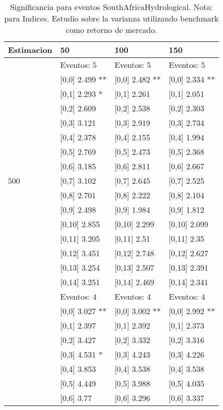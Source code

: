 \begin{table}

\caption{Significancia para eventos SouthAfricaHydrological. Nota: para Indices. Estudio sobre la varianza utilizando benchmark como retorno de mercado.}
\centering
\begin{tabular}[t]{llll}
\toprule
Estimacion & 50 & 100 & 150\\
\midrule
 & Eventos:  5 & Eventos:  5 & Eventos:  5\\
 & {}[0,0] 2.499 ** & {}[0,0] 2.482 ** & {}[0,0] 2.334 **\\
 & {}[0,1] 2.293 * & {}[0,1] 2.261 & {}[0,1] 2.051\\
 & {}[0,2] 2.609 & {}[0,2] 2.538 & {}[0,2] 2.303\\
 & {}[0,3] 3.121 & {}[0,3] 2.919 & {}[0,3] 2.734\\
\addlinespace
 & {}[0,4] 2.378 & {}[0,4] 2.155 & {}[0,4] 1.994\\
 & {}[0,5] 2.769 & {}[0,5] 2.473 & {}[0,5] 2.368\\
 & {}[0,6] 3.185 & {}[0,6] 2.811 & {}[0,6] 2.667\\
500 & {}[0,7] 3.102 & {}[0,7] 2.645 & {}[0,7] 2.525\\
 & {}[0,8] 2.701 & {}[0,8] 2.222 & {}[0,8] 2.104\\
\addlinespace
 & {}[0,9] 2.498 & {}[0,9] 1.984 & {}[0,9] 1.812\\
 & {}[0,10] 2.855 & {}[0,10] 2.299 & {}[0,10] 2.099\\
 & {}[0,11] 3.205 & {}[0,11] 2.51 & {}[0,11] 2.35\\
 & {}[0,12] 3.451 & {}[0,12] 2.748 & {}[0,12] 2.627\\
 & {}[0,13] 3.254 & {}[0,13] 2.507 & {}[0,13] 2.391\\
\addlinespace
 & {}[0,14] 3.251 & {}[0,14] 2.469 & {}[0,14] 2.341\\
 & Eventos:  4 & Eventos:  4 & Eventos:  4\\
 & {}[0,0] 3.027 ** & {}[0,0] 3.002 ** & {}[0,0] 2.992 **\\
 & {}[0,1] 2.397 & {}[0,1] 2.392 & {}[0,1] 2.373\\
 & {}[0,2] 3.427 & {}[0,2] 3.332 & {}[0,2] 3.316\\
\addlinespace
 & {}[0,3] 4.531 * & {}[0,3] 4.243 & {}[0,3] 4.226\\
 & {}[0,4] 3.853 & {}[0,4] 3.538 & {}[0,4] 3.538\\
 & {}[0,5] 4.449 & {}[0,5] 3.988 & {}[0,5] 4.035\\
 & {}[0,6] 3.77 & {}[0,6] 3.296 & {}[0,6] 3.337\\

\end{tabular}
\end{table}
